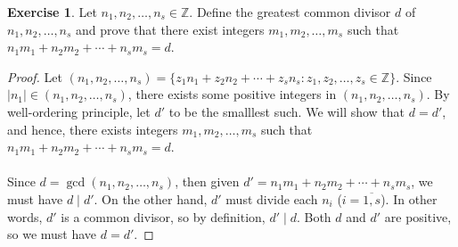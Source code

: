 \documentclass{article}
\theoremstyle{definition}
\newtheorem{exercise}{Exercise}
\begin{document}
\begin{exercise} \label{c1-ex-13}
Let $n_1, n_2, \hdots, n_s \in \mathbb{Z}$. Define the greatest common divisor $d$ of $n_1, n_2, \hdots, n_s$ and prove that there exist integers $m_1, m_2, \hdots, m_s$ such that $n_1 m_1 + n_2 m_2 + \cdots + n_s m_s = d$.
\end{exercise}
\begin{proof}
Let $(n_1, n_2, \hdots, n_s) = \{ z_1 n_1 + z_2 n_2 + \cdots + z_s n_s : z_1, z_2, \hdots, z_s \in \mathbb{Z} \}$. Since $|n_1| \in (n_1, n_2, \hdots, n_s)$, there exists some positive integers in $(n_1, n_2, \hdots, n_s)$. By well-ordering principle, let $d'$ to be the smalllest such. We will show that $d = d'$, and hence, there exists integers $m_1, m_2, \hdots, m_s$ such that $n_1 m_1 + n_2 m_2 + \cdots + n_s m_s = d$.
\\
\\
Since $d = \gcd(n_1, n_2, \hdots, n_s)$, then given $d' = n_1 m_1 + n_2 m_2 + \cdots + n_s m_s$, we must have $d \mid d'$. On the other hand, $d'$ must divide each $n_i$ ($i = \overline{1, s}$). In other words, $d'$ is a common divisor, so by definition, $d' \mid d$. Both $d$ and $d'$ are positive, so we must have $d = d'$.
\end{proof}

\newpage
\end{document}
